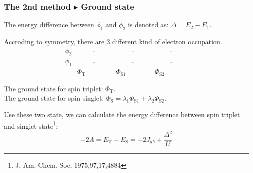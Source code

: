 \documentclass{beamer}
\begin{document}
  \begin{frame}
    \frametitle{The 2nd method \(\blacktriangleright\) Ground state}
    The energy difference between \(\phi_1\) and \(\phi_2\) is denoted as: \(\Delta = E_2 - E_1\).

    Accroding to symmetry, there are 3 different kind of electron occupation. 
    \begin{equation*}
      \begin{matrix}
      \phi_2&\ \ \overline{\hspace{4em}}\ \ &\ \ \overline{\hspace{4em}}\ \ &\ \ \overline{\hspace{4em}}\ \ \\[0.6em]
      \phi_1&\ \ \overline{\hspace{4em}}\ \ &\ \ \overline{\hspace{4em}}\ \ &\ \ \overline{\hspace{4em}}\ \ \\[0.6em]
      \ &\Phi_{\text{T}}&\Phi_{\text{S}1}&\Phi_{\text{S}2}
      \end{matrix}
    \end{equation*}
     
    The ground state for spin triplet: \(\Phi_{\text{T}}\).\\
    The ground state for spin singlet: \(\Phi_{\text{S}} = \lambda_1 \Phi_{\text{S}1} + \lambda_2 \Phi_{\text{S}2}\).

    Use these two state, we can calculate the energy difference between spin triplet and singlet state\footnote{J. Am. Chem. Soc. 1975,97,17,4884}:
    \begin{equation}
      -2A = E_\text{T} - E_\text{S} = -2J_{ab} + \dfrac{\Delta^2}{U}
    \end{equation}
  \end{frame}
\end{document}
